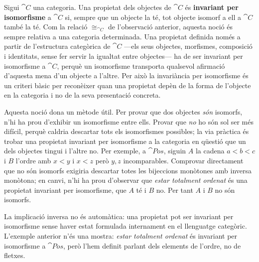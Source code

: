 \begin{observacio}\label{obs:invariancia}
Sigui $\cat{C}$ una categoria. Una propietat dels objectes de $\cat{C}$ és \textbf{invariant per isomorfisme} a $\cat{C}$ si, sempre que un objecte la té, tot objecte isomorf a ell a $\cat{C}$ també la té. Com la relació $\cong_{\cat{C}}$ de l'observació anterior, aquesta noció és sempre relativa a una categoria determinada. Una propietat definida només a partir de l'estructura categòrica de $\cat{C}$ ---els seus objectes, morfismes, composició i identitats, sense fer servir la igualtat entre objectes--- ha de ser invariant per isomorfisme a $\cat{C}$, perquè un isomorfisme transporta qualsevol afirmació d'aquesta mena d'un objecte a l'altre. Per això la invariància per isomorfisme és un criteri bàsic per reconèixer quan una propietat depèn de la forma de l'objecte en la categoria i no de la seva presentació concreta.

Aquesta noció dona un mètode útil. Per provar que dos objectes \emph{són} isomorfs, n'hi ha prou d'exhibir un isomorfisme entre ells. Provar que \emph{no} ho són sol ser més difícil, perquè caldria descartar tots els isomorfismes possibles; la via pràctica és trobar una propietat invariant per isomorfisme a la categoria en qüestió que un dels objectes tingui i l'altre no. Per exemple, a $\cat{Pos}$, siguin $A$ la cadena $a<b<c$ i $B$ l'ordre amb $x<y$ i $x<z$ però $y,z$ incomparables. Comprovar directament que no són isomorfs exigiria descartar totes les bijeccions monòtones amb inversa monòtona; en canvi, n'hi ha prou d'observar que \emph{estar totalment ordenat} és una propietat invariant per isomorfisme, que $A$ té i $B$ no. Per tant $A$ i $B$ no són isomorfs.

La implicació inversa no és automàtica: una propietat pot ser invariant per isomorfisme sense haver estat formulada internament en el llenguatge categòric. L'exemple anterior n'és una mostra: \emph{estar totalment ordenat} és invariant per isomorfisme a $\cat{Pos}$, però l'hem definit parlant dels elements de l'ordre, no de fletxes.
\end{observacio}

